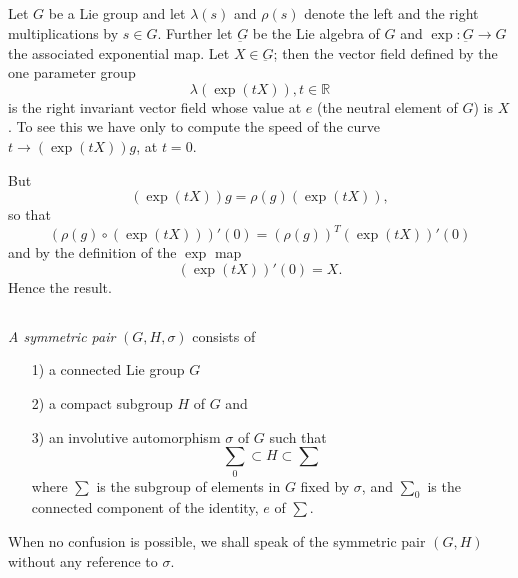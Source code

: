 \subsection{}\label{chap3:3.3.1}

Let $G$ be a Lie group and let $\lambda(s)$ and $\rho(s)$ denote the
left and the right multiplications by $s\in G$. Further let
$\underbar{G}$ be the Lie algebra of $G$ and $\exp:\underbar{G}\to G$
the associated exponential map. Let $X\in\underbar{G}$; then the
vector field defined by the one parameter group
$$
\lambda(\exp(tX)),t\in\mathbb{R}
$$
is the right invariant vector field whose value at $e$ (the neutral
element of $G$) is $X$. To see this we have only to compute the speed
of the \pageoriginale curve $t\to (\exp(tX))g$, at $t=0$.

But
$$
(\exp(tX))g=\rho(g)(\exp(tX)),
$$
so that
$$
(\rho(g)\circ (\exp(tX)))'(0)=(\rho(g))^{T}(\exp(tX))'(0)
$$
and by the definition of the $\exp$ map
$$
(\exp(tX))'(0)=X.
$$
Hence the result.

\setcounter{definition}{1}

\subsection{}\label{chap3:3.3.2}

\begin{defi*}
{\em A symmetric pair} $(G,H,\sigma)$ consists of
\begin{itemize}
\item[1)] a connected Lie group $G$

\item[2)] a compact subgroup $H$ of $G$ and

\item[3)] an involutive automorphism $\sigma$ of $G$ such that
$$
\sum_{0}\subset H\subset \sum
$$
where $\sum$ is the subgroup of elements in $G$ fixed by $\sigma$, and
$\sum_{0}$ is the connected component of the identity, $e$ of $\sum$.
\end{itemize}

When no confusion is possible, we shall speak of the symmetric pair
$(G,H)$ without any reference to $\sigma$.
\end{defi*}

